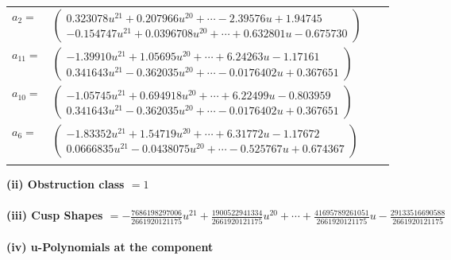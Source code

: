 \documentclass[1p]{elsarticle_modified}
\theoremstyle{definition}
\begin{document}
\begin{tabular}{m{7pt} m{180pt} m{7pt} m{180pt} }
\flushright $a_{2}=$&$\begin{pmatrix}0.323078 u^{21}+0.207966 u^{20}+\cdots-2.39576 u+1.94745\\-0.154747 u^{21}+0.0396708 u^{20}+\cdots+0.632801 u-0.675730\end{pmatrix}$ \\
\flushright $a_{11}=$&$\begin{pmatrix}-1.39910 u^{21}+1.05695 u^{20}+\cdots+6.24263 u-1.17161\\0.341643 u^{21}-0.362035 u^{20}+\cdots-0.0176402 u+0.367651\end{pmatrix}$ \\
\flushright $a_{10}=$&$\begin{pmatrix}-1.05745 u^{21}+0.694918 u^{20}+\cdots+6.22499 u-0.803959\\0.341643 u^{21}-0.362035 u^{20}+\cdots-0.0176402 u+0.367651\end{pmatrix}$ \\
\flushright $a_{6}=$&$\begin{pmatrix}-1.83352 u^{21}+1.54719 u^{20}+\cdots+6.31772 u-1.17672\\0.0666835 u^{21}-0.0438075 u^{20}+\cdots-0.525767 u+0.674367\end{pmatrix}$\\&\end{tabular}
\flushleft \textbf{(ii) Obstruction class $= 1$}\\~\\
\flushleft \textbf{(iii) Cusp Shapes $= -\frac{7686198297006}{2661920121175} u^{21}+\frac{1900522941334}{2661920121175} u^{20}+\cdots+\frac{41695789261051}{2661920121175} u-\frac{29133516690588}{2661920121175}$}\\~\\
\newpage\renewcommand{\arraystretch}{1}
\flushleft \textbf{(iv) u-Polynomials at the component}\newline \\
\end{document}
